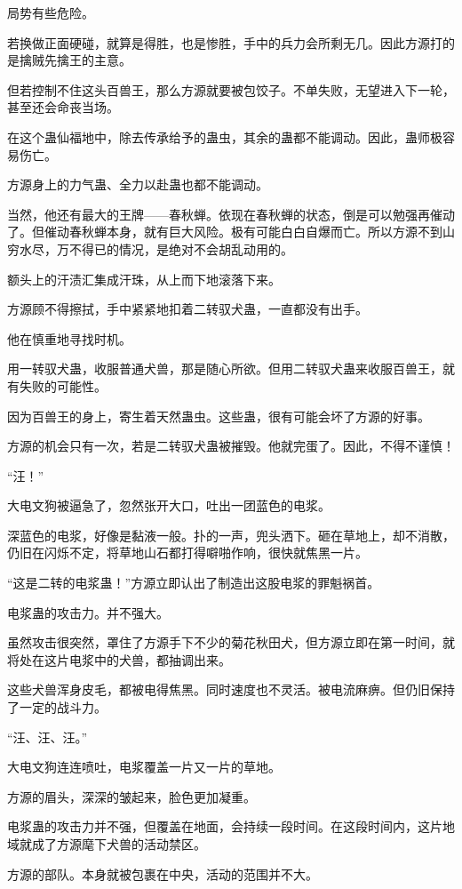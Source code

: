 \begin{this_body}
局势有些危险。

若换做正面硬碰，就算是得胜，也是惨胜，手中的兵力会所剩无几。因此方源打的是擒贼先擒王的主意。

但若控制不住这头百兽王，那么方源就要被包饺子。不单失败，无望进入下一轮，甚至还会命丧当场。

在这个蛊仙福地中，除去传承给予的蛊虫，其余的蛊都不能调动。因此，蛊师极容易伤亡。

方源身上的力气蛊、全力以赴蛊也都不能调动。

当然，他还有最大的王牌——春秋蝉。依现在春秋蝉的状态，倒是可以勉强再催动了。但催动春秋蝉本身，就有巨大风险。极有可能白白自爆而亡。所以方源不到山穷水尽，万不得已的情况，是绝对不会胡乱动用的。

额头上的汗渍汇集成汗珠，从上而下地滚落下来。

方源顾不得擦拭，手中紧紧地扣着二转驭犬蛊，一直都没有出手。

他在慎重地寻找时机。

用一转驭犬蛊，收服普通犬兽，那是随心所欲。但用二转驭犬蛊来收服百兽王，就有失败的可能性。

因为百兽王的身上，寄生着天然蛊虫。这些蛊，很有可能会坏了方源的好事。

方源的机会只有一次，若是二转驭犬蛊被摧毁。他就完蛋了。因此，不得不谨慎！

“汪！”

大电文狗被逼急了，忽然张开大口，吐出一团蓝色的电浆。

深蓝色的电浆，好像是黏液一般。扑的一声，兜头洒下。砸在草地上，却不消散，仍旧在闪烁不定，将草地山石都打得噼啪作响，很快就焦黑一片。

“这是二转的电浆蛊！”方源立即认出了制造出这股电浆的罪魁祸首。

电浆蛊的攻击力。并不强大。

虽然攻击很突然，罩住了方源手下不少的菊花秋田犬，但方源立即在第一时间，就将处在这片电浆中的犬兽，都抽调出来。

这些犬兽浑身皮毛，都被电得焦黑。同时速度也不灵活。被电流麻痹。但仍旧保持了一定的战斗力。

“汪、汪、汪。”

大电文狗连连喷吐，电浆覆盖一片又一片的草地。

方源的眉头，深深的皱起来，脸色更加凝重。

电浆蛊的攻击力并不强，但覆盖在地面，会持续一段时间。在这段时间内，这片地域就成了方源麾下犬兽的活动禁区。

方源的部队。本身就被包裹在中央，活动的范围并不大。


\end{this_body}
